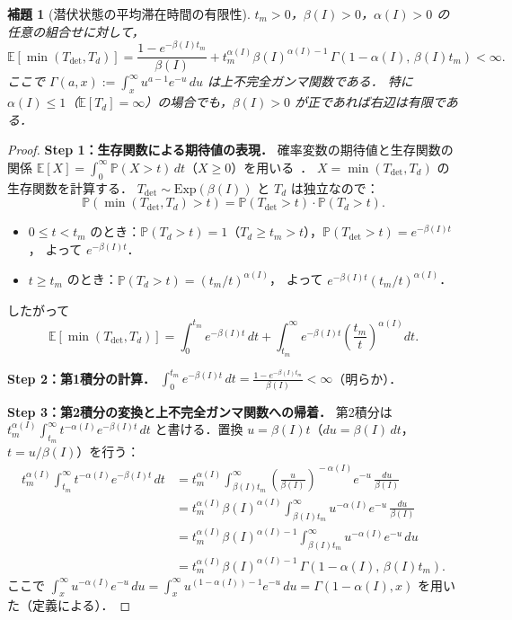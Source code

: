 \documentclass[12pt,a4paper]{article}
\theoremstyle{plain}
\newtheorem{lemma}[theorem]{補題}
\theoremstyle{definition}
\theoremstyle{remark}
\newcommand{\E}{\mathbb{E}}
\newcommand{\Prob}{\mathbb{P}}
\newcommand{\Tdet}{T_{\mathrm{det}}}
\newcommand{\betaI}{\beta(I)}
\newcommand{\alphI}{\alpha(I)}
\begin{document}
\begin{lemma}[潜伏状態の平均滞在時間の有限性]\label{lem:sojourn}
$t_m>0$，$\betaI>0$，$\alphI>0$ の任意の組合せに対して，
\begin{equation}\label{eq:E_min}
\E[\min(\Tdet,T_d)]
=\frac{1-e^{-\betaI t_m}}{\betaI}
+t_m^{\alphI}\betaI^{\alphI-1}\,\Gamma(1-\alphI,\,\betaI t_m)<\infty.
\end{equation}
ここで $\Gamma(a,x):=\int_x^\infty u^{a-1}e^{-u}\,du$ は上不完全ガンマ関数である．
特に $\alphI\le1$（$\E[T_d]=\infty$）の場合でも，$\betaI>0$ が正であれば右辺は有限である．
\end{lemma}


\begin{proof}
\textbf{Step 1：生存関数による期待値の表現．}
確率変数の期待値と生存関数の関係
$\E[X]=\int_0^\infty\Prob(X>t)\,dt$（$X\ge0$）を用いる~\cite{klein2003,ross2014}．
$X=\min(\Tdet,T_d)$ の生存関数を計算する．
$\Tdet\sim\mathrm{Exp}(\betaI)$ と $T_d$ は独立なので：
\[
\Prob\!\left(\min(\Tdet,T_d)>t\right)
=\Prob(\Tdet>t)\cdot\Prob(T_d>t).
\]
\begin{itemize}[leftmargin=2em]
\item $0\le t<t_m$ のとき：$\Prob(T_d>t)=1$（$T_d\ge t_m>t$），$\Prob(\Tdet>t)=e^{-\betaI t}$，
  よって $e^{-\betaI t}$．
\item $t\ge t_m$ のとき：$\Prob(T_d>t)=(t_m/t)^{\alphI}$，
  よって $e^{-\betaI t}(t_m/t)^{\alphI}$．
\end{itemize}
したがって
\begin{equation}\label{eq:Emin_split}
\E[\min(\Tdet,T_d)]
=\int_0^{t_m}e^{-\betaI t}\,dt
+\int_{t_m}^\infty e^{-\betaI t}\!\left(\frac{t_m}{t}\right)^{\!\alphI}\!\!dt.
\end{equation}

\textbf{Step 2：第1積分の計算．}
$\displaystyle\int_0^{t_m}e^{-\betaI t}\,dt
=\frac{1-e^{-\betaI t_m}}{\betaI}<\infty$（明らか）．

\textbf{Step 3：第2積分の変換と上不完全ガンマ関数への帰着．}
第2積分は
$t_m^{\alphI}\displaystyle\int_{t_m}^\infty t^{-\alphI}e^{-\betaI t}\,dt$
と書ける．置換 $u=\betaI t$（$du=\betaI\,dt$，$t=u/\betaI$）を行う：
\begin{align*}
t_m^{\alphI}\int_{t_m}^\infty t^{-\alphI}e^{-\betaI t}\,dt
&=t_m^{\alphI}\int_{\betaI t_m}^\infty \!\!\left(\frac{u}{\betaI}\right)^{\!-\alphI}\!e^{-u}\,\frac{du}{\betaI}\\
&=t_m^{\alphI}\betaI^{\alphI}\int_{\betaI t_m}^\infty u^{-\alphI}e^{-u}\,\frac{du}{\betaI}\\
&=t_m^{\alphI}\betaI^{\alphI-1}\int_{\betaI t_m}^\infty u^{-\alphI}e^{-u}\,du\\
&=t_m^{\alphI}\betaI^{\alphI-1}\,\Gamma(1-\alphI,\,\betaI t_m).
\end{align*}
ここで $\int_x^\infty u^{-\alphI}e^{-u}\,du=\int_x^\infty u^{(1-\alphI)-1}e^{-u}\,du=\Gamma(1-\alphI,x)$
を用いた（定義による）．


\end{proof}
\end{document}
